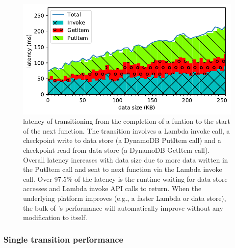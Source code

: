
\begin{figure}[t!]
    \centering
    \includegraphics[width=\columnwidth]{figures/TotalAdditionalLatencyNBreakdown.pdf}
    \caption{\name{} latency of transitioning from the completion of a funtion
    to the start of the next function. The transition involves a Lambda
    invoke call, a checkpoint write to data store (a DynamoDB PutItem call)
    and a checkpoint read from data store (a DynamoDB GetItem call). Overall
    latency increases with data size due to more data written in the PutItem
    call and sent to next function via the Lambda invoke call. Over 97.5\% of
    the latency is the
    \name{} runtime waiting for data store accesses and Lambda invoke API
    calls to return. When the underlying platform improves (e.g., a faster
    Lambda or data store), the bulk of \name{}'s performance will
    automatically improve without any modification to \name{} itself.}
    \label{fig:totallatency}
\end{figure}



\subsubsection{Single transition performance}

